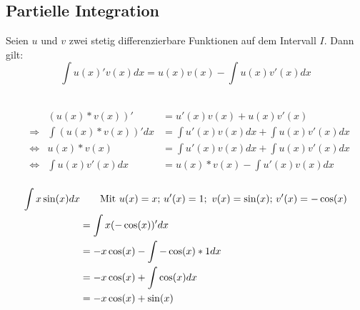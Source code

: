 \subsection{Partielle Integration}
\begin{Theorem}
  Seien $u$ und $v$ zwei stetig differenzierbare Funktionen auf dem Intervall $I$. Dann gilt:
  $$\int u(x)'v(x) dx= u(x)v(x) - \int u(x)v'(x) dx$$
\end{Theorem}
\begin{Beweis}\\
\begin{align*}
  &&(u(x)*v(x))' &= u'(x)v(x)+u(x)v'(x)\\
  &\Rightarrow & \int (u(x)*v(x))' dx &= \int u'(x)v(x)dx+\int u(x)v'(x)dx\\
  &\Leftrightarrow & u(x)*v(x) &= \int u'(x)v(x)dx + \int u(x)v'(x)dx\\
  &\Leftrightarrow & \int u(x)v'(x)dx &= u(x)*v(x)- \int u'(x)v(x)dx\\
\end{align*}
\end{Beweis}
\begin{Beispiel}
  \begin{align*}
  \int x\sin(x) dx & \text{\qquad Mit $u(x)=x$; $u'(x)=1$; \,$v(x)=\sin(x)$; $v'(x)=-\cos(x)$}\\
  &= \int x(-\cos(x))' dx\\
  &= -x\cos(x) - \int-\cos(x)*1 dx\\
  &= -x\cos(x) + \int\cos(x) dx\\
  &= -x\cos(x) + \sin(x)
\end{align*}
\end{Beispiel}

